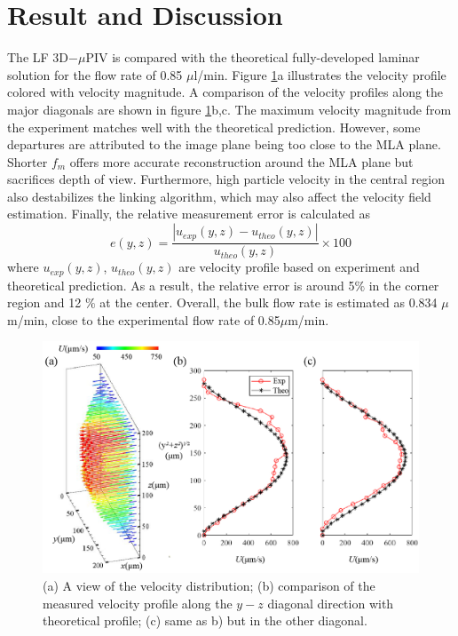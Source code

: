 \documentclass[draftthesis,fullpage]{uiucthesis}
\begin{document}
\section*{Result and Discussion}
The  LF 3D$-\mu$PIV is compared with the theoretical fully-developed laminar solution for the flow rate of 0.85 $\mu$l/min.
Figure \ref{fig:result}a illustrates the velocity profile colored with velocity magnitude. A comparison of the velocity profiles along the major diagonals are shown in figure \ref{fig:result}b,c. The maximum velocity magnitude from the experiment matches well with the theoretical prediction. However, some departures are attributed to the image plane being too close to the MLA plane. Shorter $f_m$ offers more accurate reconstruction around the MLA plane but sacrifices depth of view. Furthermore, high particle velocity in the central region also destabilizes the linking algorithm, which may also affect the velocity field estimation. Finally, the relative measurement error is calculated as
\begin{equation}
  e(y,z) =  \frac{\left| u_{exp}(y,z) - u_{theo}(y,z) \right|}{u_{theo}(y,z)} \times 100
\label{eq:Uncertainty}
\end{equation}
where $u_{exp}(y,z)$, $u_{theo}(y,z)$ are velocity profile based on experiment and theoretical prediction.
As a result, the relative error is around 5$\%$ in the corner region and 12 $\%$ at the center. Overall, the bulk flow rate is estimated as 0.834 $\mu$m/min, close to the experimental flow rate of 0.85$\mu$m/min.
\begin{figure}[h]
       \centerline{\includegraphics[width = 0.6\linewidth]{fig/figure8.jpg}} 
       \caption{(a) A view of the velocity distribution; (b) comparison of the measured velocity profile along the $y-z$ diagonal direction with theoretical profile; (c) same as b) but in the other diagonal.}
     \label{fig:result}
\end{figure}
\end{document}
